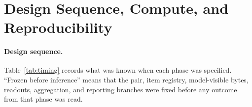 \documentclass[11pt]{article}
\begin{document}


\FloatBarrier






















\FloatBarrier

\section{Design Sequence, Compute, and Reproducibility}
\label{app:compute}

\paragraph{Design sequence.}
Table~\ref{tab:timing} records what was known when each phase was specified.
``Frozen before inference'' means that the pair, item registry, model-visible
bytes, readouts, aggregation, and reporting branches were fixed before any
outcome from that phase was read.
\end{document}
